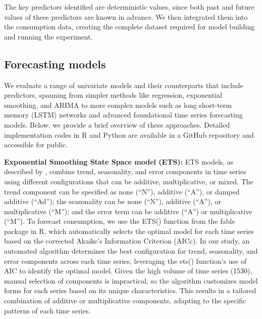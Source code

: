 \documentclass[
  authoryear,
  preprint,
  3p]{elsarticle}
\begin{document}
The key predictors identified are deterministic values, since both past
and future values of these predictors are known in advance. We then
integrated them into the consumption data, creating the complete dataset
required for model building and running the experiment.

\subsection{Forecasting models}\label{forecasting-models}

We evaluate a range of univariate models and their counterparts that
include predictors, spanning from simpler methods like regression,
exponential smoothing, and ARIMA to more complex models such as long
short-term memory (LSTM) networks and advanced foundational time series
forecasting models. Below, we provide a brief overview of these
approaches. Detailed implementation codes in R and Python are available
in a GitHub repository and accessible for public.

\textbf{Exponential Smoothing State Space model (ETS):} ETS models, as
described by \citet{hyndman2021forecasting}, combine trend, seasonality,
and error components in time series using different configurations that
can be additive, multiplicative, or mixed. The trend component can be
specified as none (``N''), additive (``A''), or damped additive
(``Ad''); the seasonality can be none (``N''), additive (``A''), or
multiplicative (``M''); and the error term can be additive (``A'') or
multiplicative (``M''). To forecast consumption, we use the ETS()
function from the fable package in R, which automatically selects the
optimal model for each time series based on the corrected Akaike's
Information Criterion (AICc). In our study, an automated algorithm
determines the best configuration for trend, seasonality, and error
components across each time series, leveraging the ets() function's use
of AIC to identify the optimal model. Given the high volume of time
series (1530), manual selection of components is impractical, so the
algorithm customizes model forms for each series based on its unique
characteristics. This results in a tailored combination of additive or
multiplicative components, adapting to the specific patterns of each
time series.
\end{document}
